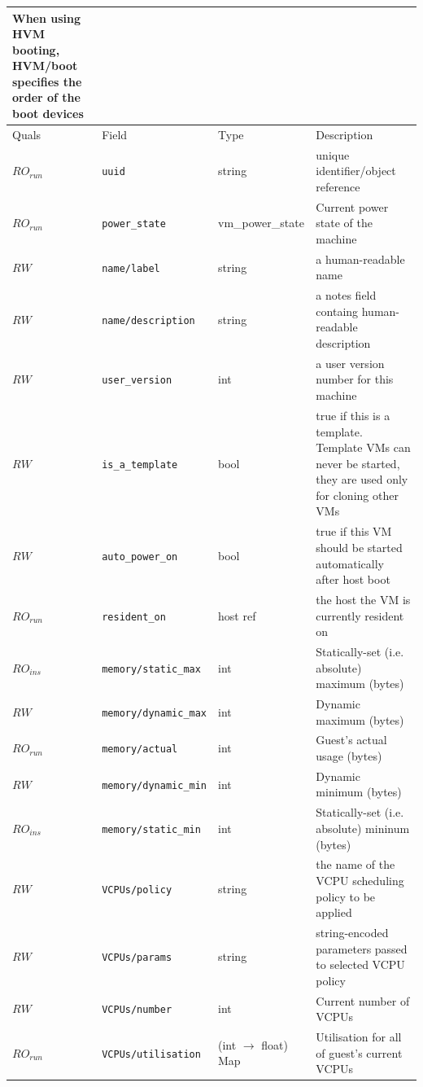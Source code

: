 \begin{longtable}{|lllp{}|}
{{When using HVM booting, HVM/boot specifies the order of the boot devices}} \\
\hline
Quals & Field & Type & Description \\
\hline
$\mathit{RO}_\mathit{run}$ &  {\tt uuid} & string & unique identifier/object reference \\
$\mathit{RO}_\mathit{run}$ &  {\tt power\_state} & vm\_power\_state & Current power state of the machine \\
$\mathit{RW}$ &  {\tt name/label} & string & a human-readable name \\
$\mathit{RW}$ &  {\tt name/description} & string & a notes field containg human-readable description \\
$\mathit{RW}$ &  {\tt user\_version} & int & a user version number for this machine \\
$\mathit{RW}$ &  {\tt is\_a\_template} & bool & true if this is a template. Template VMs can never be started, they are used only for cloning other VMs \\
$\mathit{RW}$ &  {\tt auto\_power\_on} & bool & true if this VM should be started automatically after host boot \\
$\mathit{RO}_\mathit{run}$ &  {\tt resident\_on} & host ref & the host the VM is currently resident on \\
$\mathit{RO}_\mathit{ins}$ &  {\tt memory/static\_max} & int & Statically-set (i.e. absolute) maximum (bytes) \\
$\mathit{RW}$ &  {\tt memory/dynamic\_max} & int & Dynamic maximum (bytes) \\
$\mathit{RO}_\mathit{run}$ &  {\tt memory/actual} & int & Guest's actual usage (bytes) \\
$\mathit{RW}$ &  {\tt memory/dynamic\_min} & int & Dynamic minimum (bytes) \\
$\mathit{RO}_\mathit{ins}$ &  {\tt memory/static\_min} & int & Statically-set (i.e. absolute) mininum (bytes) \\
$\mathit{RW}$ &  {\tt VCPUs/policy} & string & the name of the VCPU scheduling policy to be applied \\
$\mathit{RW}$ &  {\tt VCPUs/params} & string & string-encoded parameters passed to selected VCPU policy \\
$\mathit{RW}$ &  {\tt VCPUs/number} & int & Current number of VCPUs \\
$\mathit{RO}_\mathit{run}$ &  {\tt VCPUs/utilisation} & (int $\rightarrow$ float) Map & Utilisation for all of guest's current VCPUs \\

\end{longtable}
